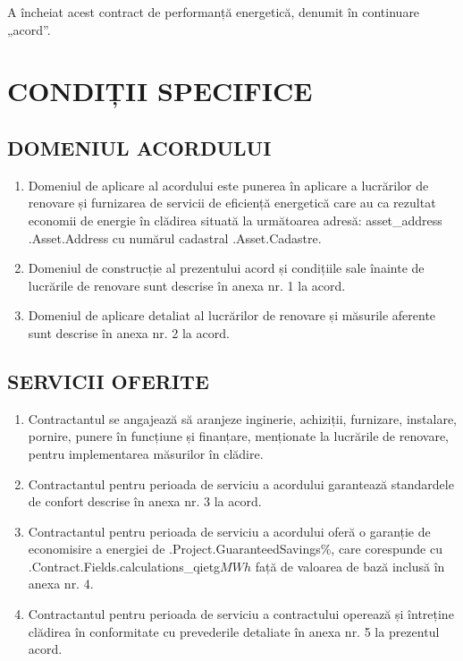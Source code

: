 A încheiat acest contract de performanță energetică, denumit în continuare „acord”.

\section{CONDIȚII SPECIFICE}
\subsection{DOMENIUL ACORDULUI}
\begin{enumerate}
	\item Domeniul de aplicare al acordului este punerea în aplicare a lucrărilor de renovare și furnizarea de servicii de eficiență energetică care au ca rezultat economii de energie în clădirea situată la următoarea adresă: {{asset_address .Asset.Address}} cu numărul cadastral {{.Asset.Cadastre}}.
	\item Domeniul de construcție al prezentului acord și condițiile sale înainte de lucrările de renovare sunt descrise în anexa nr. 1 la acord.
	\item Domeniul de aplicare detaliat al lucrărilor de renovare și măsurile aferente sunt descrise în anexa nr. 2 la acord.
\end{enumerate}

\subsection{SERVICII OFERITE}
\begin{enumerate}
	\item Contractantul se angajează să aranjeze inginerie, achiziții, furnizare, instalare, pornire, punere în funcțiune și finanțare, menționate la lucrările de renovare, pentru implementarea măsurilor în clădire.
	\item Contractantul pentru perioada de serviciu a acordului garantează standardele de confort descrise în anexa nr. 3 la acord.
	\item Contractantul pentru perioada de serviciu a acordului oferă o garanție de economisire a energiei de {{.Project.GuaranteedSavings}}\%, care corespunde cu {{.Contract.Fields.calculations_qietg}}$MWh$ față de valoarea de bază inclusă în anexa nr. 4.
	\item Contractantul pentru perioada de serviciu a contractului operează și întreține clădirea în conformitate cu prevederile detaliate în anexa nr. 5 la prezentul acord.
\end{enumerate}


